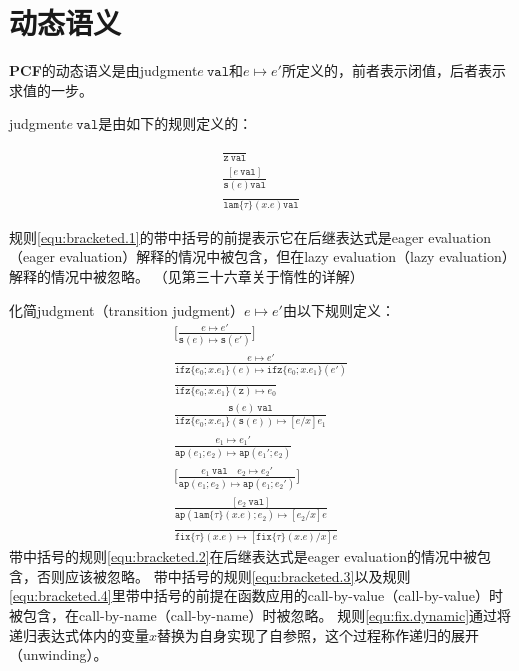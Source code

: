 \section{动态语义}

\textbf{PCF}的动态语义是由\gls{judgment}\(e\ \mathtt{val}\)和\(e \longmapsto e'\)所定义的，前者表示闭值，后者表示求值的一步。

\gls{judgment}\(e\ \mathtt{val}\)是由如下的规则定义的：

\begin{gather}
	\frac{}{
		\mathtt{z}\ \mathtt{val}
	}
	\tag{19.2a} \\
	\frac{
		[e\ \mathtt{val}]
	}{
		\mathtt{s}(e) \mathtt{val}
	}
	\tag{19.2b} 
	\label{equ:bracketed.1} \\
	\frac{}{
		\mathtt{lam}\{\tau\}(x.e) \mathtt{val}
	}
	\tag{19.2c}
\end{gather}

规则\ref{equ:bracketed.1}的带中括号的前提表示它在后继表达式是\gls{eager evaluation}（eager evaluation）解释的情况中被包含，但在\gls{lazy evaluation}（lazy evaluation）解释的情况中被忽略。
（见第三十六章关于惰性的详解）

化简\gls{judgment}（transition judgment）\(e \longmapsto e'\)由以下规则定义：
\begin{gather}
	\bigg[
	\frac{
		e \longmapsto e'
	}{
		\mathtt{s}(e) \longmapsto \mathtt{s}(e')
	}
	\bigg]
	\tag{19.3a}
	\label{equ:bracketed.2} \\
	\frac{
		e \longmapsto e'
	}{
		\mathtt{ifz}\{e_0;x.e_1\}(e) \longmapsto \mathtt{ifz}\{e_0;x.e_1\}(e')
	}
	\tag{19.3b} \\
	\frac{}{
		\mathtt{ifz}\{e_0;x.e_1\}(\mathtt{z}) \longmapsto e_0
	}
	\tag{19.3c} \\
	\frac{
		\mathtt{s}(e)\ \mathtt{val}
	}{
		\mathtt{ifz}\{e_0;x.e_1\}(\mathtt{s}(e)) \longmapsto [e/x]e_1
	}
	\tag{19.3d} \\
	\frac{
		e_1 \longmapsto e_1'
	}{
		\mathtt{ap}(e_1;e_2) \longmapsto \mathtt{ap}(e_1';e_2)
	}
	\tag{19.3e} \\
	\bigg[
	\frac{
		e_1\ \mathtt{val} \quad e_2 \longmapsto e_2'
	}{
		\mathtt{ap}(e_1;e_2) \longmapsto \mathtt{ap}(e_1;e_2')
	}
	\bigg]
	\tag{19.3f} 
	\label{equ:bracketed.3} \\
	\frac{
		[e_2\ \mathtt{val}]
	}{
		\mathtt{ap}(\mathtt{lam}\{\tau\}(x.e);e_2) \longmapsto [e_2/x]e
	}
	\tag{19.3g} 
	\label{equ:bracketed.4} \\
	\frac{}{
		\mathtt{fix}\{\tau\}(x.e) \longmapsto [\mathtt{fix}\{\tau\}(x.e)/x]e
	}
	\tag{19.3h}
	\label{equ:fix.dynamic}
\end{gather}
带中括号的规则\ref{equ:bracketed.2}在后继表达式是\gls{eager evaluation}的情况中被包含，否则应该被忽略。
带中括号的规则\ref{equ:bracketed.3}以及规则\ref{equ:bracketed.4}里带中括号的前提在函数应用的\gls{call-by-value}（call-by-value）时被包含，在\gls{call-by-name}（call-by-name）时被忽略。
规则\ref{equ:fix.dynamic}通过将递归表达式体内的变量\(x\)替换为自身实现了自参照，这个过程称作递归的展开（unwinding）。

